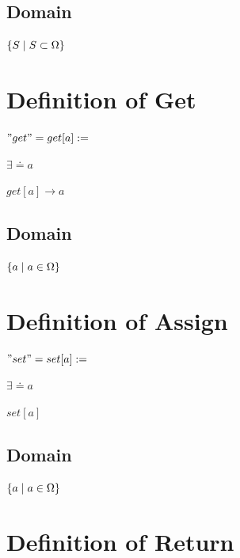 \documentclass[11pt]{article}
\begin{document}
\subsection{Domain}
\begin{center}
$
\{S \hspace{1mm} | \hspace{1mm} S \subset \Omega\}
$
\end{center}




\section{Definition of Get}
\begin{center}
$
"get" = get[a] :=
$
\end{center}
\vspace{1mm}
$\exists \doteq a$
\begin{center}
$
get[a] \rightarrow a
$
\end{center}
\subsection{Domain}
\begin{center}
$
\{ a \hspace{1mm} | \hspace{1mm} a \in \Omega\}
$
\end{center}



\section{Definition of Assign}
\begin{center}
$
"set" = set[a] :=
$
\end{center}
\vspace{1mm}
$\exists \doteq a$
\begin{center}
$
set[a]
$
\end{center}
\subsection{Domain}
\begin{center}
$
\{ a \hspace{1mm} | \hspace{1mm} a \in \Omega\}
$
\end{center}



\section{Definition of Return}
\end{document}
